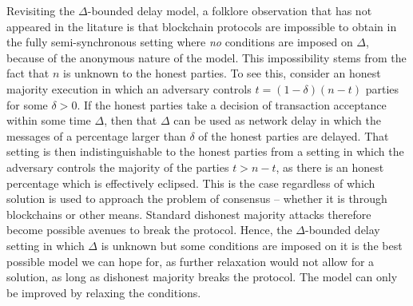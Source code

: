 \begin{remark}
Revisiting the $\Delta$-bounded delay model, a folklore observation that has not appeared in
the litature is that blockchain protocols are impossible to obtain in the fully
semi-synchronous setting where \emph{no} conditions are imposed on $\Delta$,
because of the anonymous nature of the model. This impossibility stems from the
fact that $n$ is unknown to the honest parties. To see this, consider an
honest majority execution in which an adversary controls $t = (1 - \delta)(n -
t)$ parties for some $\delta > 0$. If the honest parties take a decision of
transaction acceptance within some time $\Delta$, then that $\Delta$ can be used
as network delay in which the messages of a percentage larger than $\delta$ of
the honest parties are delayed. That setting is then indistinguishable to the
honest parties from a setting in which the adversary controls the majority of
the parties $t > n - t$, as there is an honest percentage which is effectively
eclipsed. This is the case regardless of which solution is used to approach the
problem of consensus -- whether it is through blockchains or other means.
Standard dishonest majority attacks therefore become possible avenues to break
the protocol. Hence, the $\Delta$-bounded delay setting in which $\Delta$ is
unknown but some conditions are imposed on it is the best possible model we can
hope for, as further relaxation would not allow for a solution, as long as
dishonest majority breaks the protocol. The model can only be improved by
relaxing the conditions.
\end{remark}

